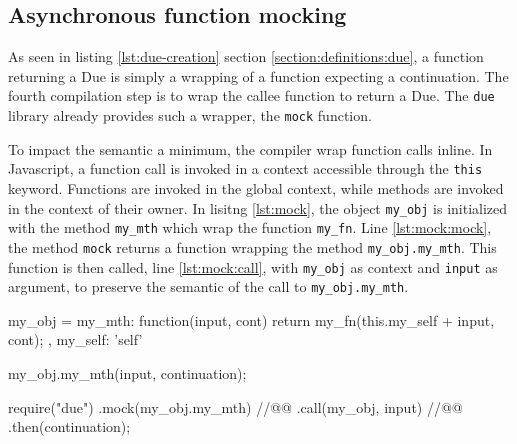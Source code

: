 \subsection{Asynchronous function mocking} \label{section:limits:mock}

As seen in listing \ref{lst:due-creation} section \ref{section:definitions:due}, a function returning a Due is simply a wrapping of a function expecting a continuation.
The fourth compilation step is to wrap the callee function to return a Due.
The \texttt{due} library already provides such a wrapper, the \texttt{mock} function.

To impact the semantic a minimum, the compiler wrap function calls inline.
In Javascript, a function call is invoked in a context accessible through the \texttt{this} keyword.
Functions are invoked in the global context, while methods are invoked in the context of their owner.
In lisitng \ref{lst:mock}, the object \texttt{my_obj} is initialized with the method \texttt{my_mth} which wrap the function \texttt{my_fn}.
Line \ref{lst:mock:mock}, the method \texttt{mock} returns a function wrapping the method \texttt{my_obj.my_mth}.
This function is then called, line \ref{lst:mock:call}, with \texttt{my_obj} as context and \texttt{input} as argument, to preserve the semantic of the call to \texttt{my_obj.my_mth}.

\begin{code}[js, %
             caption={Inline mock of the callee}, %
             label={lst:mock}] %
my_obj = {
  my_mth: function(input, cont) {
    return my_fn(this.my_self + input, cont);
  },
  my_self: 'self'
}

my_obj.my_mth(input, continuation);

require("due")
.mock(my_obj.my_mth) //@\label{lst:mock:mock}@
.call(my_obj, input) //@\label{lst:mock:call}@
.then(continuation);
\end{code}

